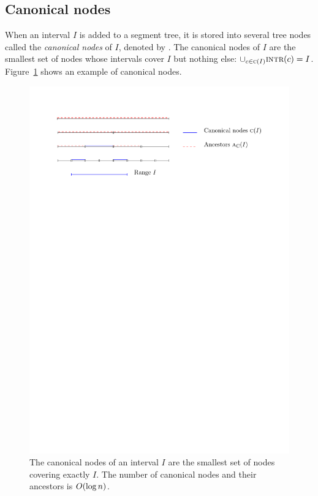 \documentclass[english,gradu]{tktltiki2018}
\begin{document}
\subsection{Canonical nodes}

When an interval $I$ is added to a segment tree, it is stored into several tree nodes called the \emph{canonical nodes} of $I$, denoted by .
The canonical nodes of $I$ are the smallest set of nodes whose intervals cover $I$ but nothing else: $\cup_{c\in\textsc{c}(I)} \textsc{intr}(c)=I$.
Figure~\ref{fig:canon} shows an example of canonical nodes.

\begin{figure}\centering
	\includegraphics[scale=0.75,page=1]{fig/canon}
	\caption{The canonical nodes of an interval $I$ are the smallest set of nodes covering exactly $I$.
	The number of canonical nodes  and their ancestors  is $O(\log n)$.}\label{fig:canon}
\end{figure}
\end{document}
